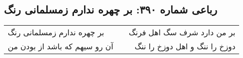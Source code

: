 \begin{center}
\section*{رباعی شماره ۳۹۰: بر چهره ندارم زمسلمانی رنگ}
\label{sec:sh390}
\begin{longtable}{l p{0.5cm} r}
بر چهره ندارم زمسلمانی رنگ
&&
بر من دارد شرف سگ اهل فرنگ
\\
آن رو سیهم که باشد از بودن من
&&
دوزخ را ننگ و اهل دوزخ را ننگ
\\
\end{longtable}
\end{center}
